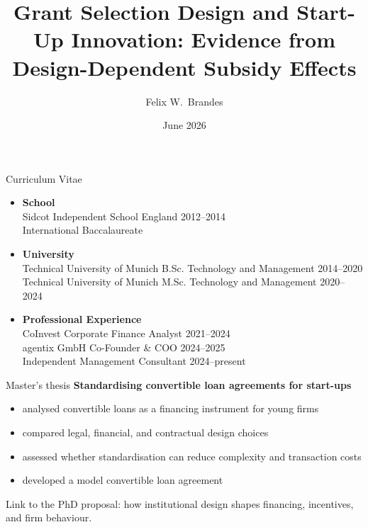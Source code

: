 \documentclass[aspectratio=169]{beamer}
\title{Grant Selection Design and Start-Up Innovation: Evidence from Design-Dependent Subsidy Effects}
\subtitle{}
\author{Felix W.\ Brandes}
\institute{Università degli Studi di Verona}
\date{June 2026}
\newcommand{\highlight}[1]{\textcolor{VeronaBlue}{\textbf{#1}}}
\begin{document}
\begin{frame}
  \titlepage
\end{frame}

\begin{frame}{Curriculum Vitae}
  \begin{itemize}
    \item \textbf{School} \\
      Sidcot Independent School {\color{muted}\small England \hfill 2012--2014} \\
      {\color{muted}\small International Baccalaureate}
    \vspace{0.8ex}
    \item \textbf{University} \\
      Technical University of Munich {\color{muted}\small B.Sc. Technology and Management \hfill 2014--2020} \\  
      Technical University of Munich {\color{muted}\small M.Sc. Technology and Management \hfill 2020--2024} \\ 
    \vspace{0.8ex}
    \item \textbf{Professional Experience} \\
      CoInvest Corporate Finance {\color{muted}\small Analyst \hfill 2021--2024} \\  
      agentix GmbH {\color{muted}\small Co-Founder \& COO \hfill 2024--2025} \\
      Independent Management Consultant {\color{muted}\small  \hfill 2024--present}
  \end{itemize}
\end{frame}

\begin{frame}{Master’s thesis}
  \large \highlight{Standardising convertible loan agreements for start-ups}
  \vspace{0.35cm}
 \normalsize
\begin{itemize}
  \item analysed convertible loans as a financing instrument for young firms
  \item compared legal, financial, and contractual design choices
  \item assessed whether standardisation can reduce complexity and transaction costs
  \item developed a model convertible loan agreement 
  \end{itemize}
  \vspace{0.25cm}
  Link to the PhD proposal: how institutional design shapes financing, incentives, and firm behaviour.
\end{frame}
\end{document}
